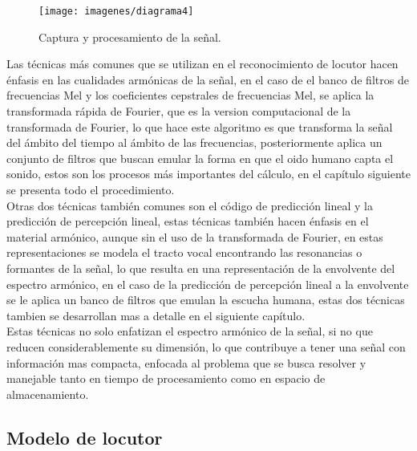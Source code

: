 \begin{figure}[H]
	\begin{center}
	\texttt{[image: imagenes/diagrama4]} \\
	\caption{Captura y procesamiento de la señal.}
	\label{fig:diag_verif_locutor}
	\end{center}
\end{figure}

Las t\'ecnicas m\'as comunes que se utilizan en el reconocimiento de locutor hacen \'enfasis en las cualidades arm\'onicas de la señal, en el caso de el banco de filtros de frecuencias Mel y los coeficientes cepstrales de frecuencias Mel, se aplica la transformada r\'apida de Fourier, que es la version computacional de la transformada de Fourier, lo que hace este algoritmo es que transforma la señal del \'ambito del tiempo al \'ambito de las frecuencias, posteriormente aplica un conjunto de filtros que buscan emular la forma en que el oido humano capta el sonido, estos son los procesos m\'as importantes del c\'alculo, en el cap\'itulo siguiente se presenta todo el procedimiento.\\

Otras dos t\'ecnicas tambi\'en comunes son el c\'odigo de predicci\'on lineal y la predicci\'on de percepci\'on lineal, estas t\'ecnicas tambi\'en hacen \'enfasis en el material arm\'onico, aunque sin el uso de la transformada de Fourier, en estas representaciones se modela el tracto vocal encontrando las resonancias o formantes de la señal, lo que resulta en una representaci\'on de la envolvente del espectro arm\'onico, en el caso de la predicci\'on de percepci\'on lineal a la envolvente se le aplica un banco de filtros que emulan la escucha humana, estas dos t\'ecnicas tambien se desarrollan mas a detalle en el siguiente cap\'itulo.\\

Estas t\'ecnicas no solo enfatizan el espectro arm\'onico de la señal, si no que reducen considerablemente su dimensi\'on, lo que contribuye a tener una señal con informaci\'on mas compacta, enfocada al problema que se busca resolver y manejable tanto en tiempo de procesamiento como en espacio de almacenamiento.

\subsection{Modelo de locutor}

